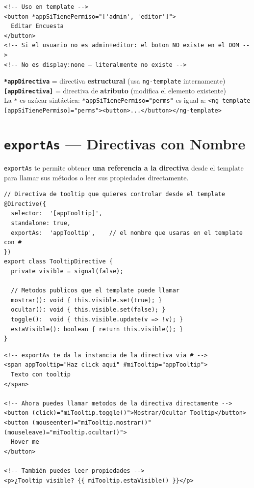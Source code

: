\documentclass[12pt, a4paper]{article}
\begin{document}
\begin{lstlisting}
<!-- Uso en template -->
<button *appSiTienePermiso="['admin', 'editor']">
  Editar Encuesta
</button>
<!-- Si el usuario no es admin+editor: el boton NO existe en el DOM -->
<!-- No es display:none — literalmente no existe -->
\end{lstlisting}

\begin{tcolorbox}[importante, title={\emoji{light-bulb} \emoji{star} \texttt{*} vs \texttt{[ ]} en Directivas}]
  \textbf{\texttt{*appDirectiva}} = directiva \textbf{estructural} (usa \texttt{ng-template} internamente)\\
  \textbf{\texttt{[appDirectiva]}} = directiva de \textbf{atributo} (modifica el elemento existente)\\[0.3cm]
  La \texttt{*} es azúcar sintáctica:
  \texttt{*appSiTienePermiso="perms"} es igual a:
  \texttt{<ng-template [appSiTienePermiso]="perms"><button>...</button></ng-template>}
\end{tcolorbox}

\section{  \texttt{exportAs} --- Directivas con Nombre}

\texttt{exportAs} te permite obtener \textbf{una referencia a la directiva} desde el template
para llamar sus métodos o leer sus propiedades directamente.

\begin{lstlisting}
// Directiva de tooltip que quieres controlar desde el template
@Directive({
  selector:  '[appTooltip]',
  standalone: true,
  exportAs:  'appTooltip',    // el nombre que usaras en el template con #
})
export class TooltipDirective {
  private visible = signal(false);

  // Metodos publicos que el template puede llamar
  mostrar(): void { this.visible.set(true); }
  ocultar(): void { this.visible.set(false); }
  toggle():  void { this.visible.update(v => !v); }
  estaVisible(): boolean { return this.visible(); }
}
\end{lstlisting}

\begin{lstlisting}
<!-- exportAs te da la instancia de la directiva via # -->
<span appTooltip="Haz click aqui" #miTooltip="appTooltip">
  Texto con tooltip
</span>

<!-- Ahora puedes llamar metodos de la directiva directamente -->
<button (click)="miTooltip.toggle()">Mostrar/Ocultar Tooltip</button>
<button (mouseenter)="miTooltip.mostrar()" (mouseleave)="miTooltip.ocultar()">
  Hover me
</button>

<!-- También puedes leer propiedades -->
<p>¿Tooltip visible? {{ miTooltip.estaVisible() }}</p>
\end{lstlisting}
\end{document}
